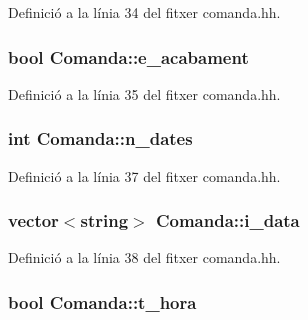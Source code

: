 Definició a la línia 34 del fitxer comanda.\+hh.

\hypertarget{class_comanda_a0f7472af37d7f6c24f74fbac60e4a696}{}
\subsubsection[{e\+\_\+acabament}]{\setlength{\rightskip}{0pt plus 5cm}bool Comanda\+::e\+\_\+acabament\hspace{0.3cm}{\ttfamily [private]}}\label{class_comanda_a0f7472af37d7f6c24f74fbac60e4a696}


Definició a la línia 35 del fitxer comanda.\+hh.

\hypertarget{class_comanda_a0a4e13d8edba10c69d1b058d8fc6a7c3}{}
\subsubsection[{n\+\_\+dates}]{\setlength{\rightskip}{0pt plus 5cm}int Comanda\+::n\+\_\+dates\hspace{0.3cm}{\ttfamily [private]}}\label{class_comanda_a0a4e13d8edba10c69d1b058d8fc6a7c3}


Definició a la línia 37 del fitxer comanda.\+hh.

\hypertarget{class_comanda_a06ee1d3173ee0ae52c588689e9263099}{}
\subsubsection[{i\+\_\+data}]{\setlength{\rightskip}{0pt plus 5cm}vector$<$string$>$ Comanda\+::i\+\_\+data\hspace{0.3cm}{\ttfamily [private]}}\label{class_comanda_a06ee1d3173ee0ae52c588689e9263099}


Definició a la línia 38 del fitxer comanda.\+hh.

\hypertarget{class_comanda_ae481194a2016e940e655173e897d214d}{}
\subsubsection[{t\+\_\+hora}]{\setlength{\rightskip}{0pt plus 5cm}bool Comanda\+::t\+\_\+hora\hspace{0.3cm}{\ttfamily [private]}}\label{class_comanda_ae481194a2016e940e655173e897d214d}


